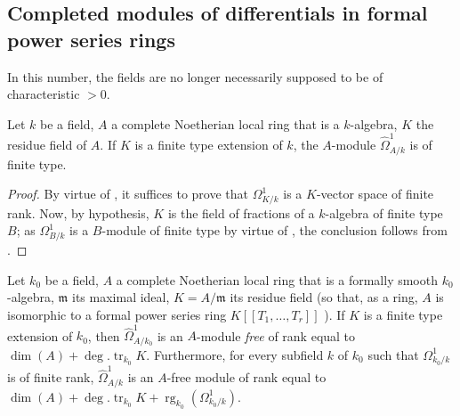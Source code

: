 \subsection{Completed modules of differentials in formal power series rings}
\label{subsection:0.21.9}

In this number, the fields are no longer necessarily supposed to be of characteristic $>0$.

\begin{lemma}[21.9.1]
\label{0.21.9.1}
Let $k$ be a field, $A$ a complete Noetherian local ring that is a $k$-algebra, $K$ the residue field of $A$.
If $K$ is a finite type extension of $k$, the $A$-module $\widehat{\Omega}^1_{A/k}$ is of finite type.
\end{lemma}

\begin{proof}
By virtue of , it suffices to prove that $\Omega^1_{K/k}$ is a $K$-vector space of finite rank.
Now, by hypothesis, $K$ is the field of fractions of a $k$-algebra of finite type $B$; as $\Omega^1_{B/k}$ is a $B$-module of finite type by virtue of , the conclusion follows from .
\end{proof}

\begin{proposition}[21.9.2]
\label{0.21.9.2}
Let $k_0$ be a field, $A$ a complete Noetherian local ring that is a formally smooth $k_0$-algebra, $\mathfrak{m}$ its maximal ideal, $K=A/\mathfrak{m}$ its residue field \textup{(}so that, as a ring, $A$ is isomorphic to a formal power series ring $K[[T_1,\ldots,T_r]]$ \textup{)}.
If $K$ is a finite type extension of $k_0$, then $\widehat{\Omega}^1_{A/k_0}$ is an $A$-module \emph{free} of rank equal to $\dim(A)+\deg.\operatorname{tr}_{k_0} K$.
Furthermore, for every subfield $k$ of $k_0$ such that $\Omega^1_{k_0/k}$ is of finite rank, $\widehat{\Omega}^1_{A/k}$ is an $A$-free module of rank equal to $\dim(A)+\deg.\operatorname{tr}_{k_0} K+\operatorname{rg}_{k_0}(\Omega^1_{k_0/k})$.
\end{proposition}

